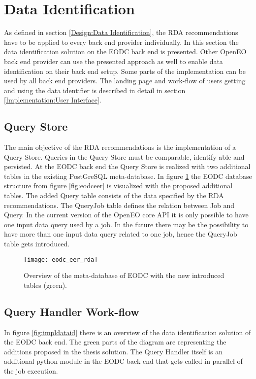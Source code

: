 \documentclass[draft,final]{vutinfth} %
\begin{document}
\section{Data Identification}\label{Implementation:Data Identification}

As defined in section \ref{Design:Data Identification}, the RDA recommendations have to be applied to every back end provider individually. In this section the data identification solution on the EODC back end is presented. Other OpenEO back end provider can use the presented approach as well to enable data identification on their back end setup. Some parts of the implementation can be used by all back end providers. The landing page and work-flow of users getting and using the data identifier is described in detail in section \ref{Implementation:User Interface}. \\

\subsection{Query Store}
The main objective of the RDA recommendations is the implementation of a Query Store. Queries in the Query Store must be comparable, identify able and persisted. At the EODC back end the Query Store is realized with two additional tables in the existing PostGreSQL meta-database. In figure \ref{fig:eer_rda} the EODC database structure from figure \ref{fig:eodceer} is visualized with the proposed additional tables. The added Query table consists of the data specified by the RDA recommendations. The QueryJob table defines the relation between Job and Query. In the current version of the OpenEO core API it is only possible to have one input data query used by a job. In the future there may be the possibility to have more than one input data query related to one job, hence the QueryJob table gets introduced. 

\begin{figure}[h]
	\centering
	\texttt{[image: eodc\_eer\_rda]}
	\caption{Overview of the meta-database of EODC with the new introduced tables (green).}
	\label{fig:eer_rda} %
\end{figure}

\subsection{Query Handler Work-flow}
In figure \ref{fig:impldataid} there is an overview of the data identification solution of the EODC back end. The green parts of the diagram are representing the additions proposed in the thesis solution. The Query Handler itself is an additional python module in the EODC back end that gets called in parallel of the job execution. 
\end{document}
